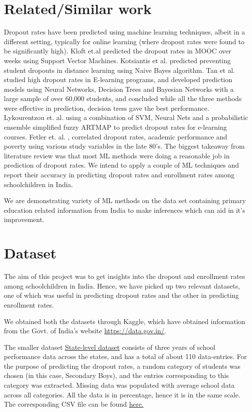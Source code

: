 \documentclass{article}
\begin{document}
\section{Related/Similar work}
Dropout rates have been predicted using machine learning techniques, albeit in a different setting, typically for online learning (where dropout rates were found to be significantly high). Kloft et.al \cite{kloft2014predicting} predicted the dropout rates in MOOC over weeks using Support Vector Machines. Kotsiantis et al. \cite{kotsiantis2003preventing} predicted preventing student dropouts in distance learning using Naive Bayes algorithm. Tan et al. \cite{tan2015prediction} studied high dropout rates in E-learning programs, and developed prediction models using Neural Networks, Decision Trees and Bayesian Networks with a large sample of over 60,000 students, and concluded while all the three methods were effective in prediction, decision tress gave the best performance. Lykourentzou et. al. \cite{lykourentzou2009dropout} using a combination of SVM, Neural Nets and a probabilistic ensemble simplified fuzzy ARTMAP to predict dropout rates for e-learning courses. Fetler et. al. \cite{fetler1989school}, correlated dropout rates, academic performance and poverty using various study variables in the late 80's. The biggest takeaway from literature review was that most ML methods were doing a reasonable job in prediction of dropout rates. We intend to apply a couple of ML techniques and report their accuracy in predicting dropout rates and enrollment rates among schoolchildren in India. 

We are demonstrating variety of ML methods on the data set containing primary education related information from India to make inferences which can aid in it's improvement. 

\section{Dataset}

The aim of this project was to get insights into the dropout and enrollment rates among schoolchildren in India. Hence, we have picked up two relevant datasets, one of which was useful in predicting dropout rates and the other in predicting enrollment rates.

We obtained both the datasets through Kaggle, which have obtained information from the Govt. of India's website \href{https://data.gov.in/}{https://data.gov.in/}. 

The smaller dataset \href{https://www.kaggle.com/vidyapb/indian-school-education-statistics}{State-level dataset} consists of three years of school performance data across the states, and has a total of about 110 data-entries. For the purpose of predicting the dropout rates, a random category of students was chosen (in this case, Secondary Boys), and the entries corresponding to this category was extracted. Missing data was populated with average school data across all categories. All the data is in percentage, hence it is in the same scale. The corresponding CSV file can be found  \href{https://uwprod-my.sharepoint.com/:x:/g/personal/ssridhara_wisc_edu/Ebu49ou21lVCi4geyN82jpkBzErhT8QkI6XciYx0ed4Cag?e=ExgZ3z}{here.} 
\end{document}
